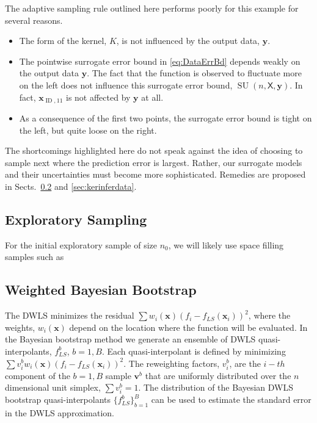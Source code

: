 \documentclass[11pt]{NSFamsart}
\DeclareMathOperator{\ID}{ID}
\DeclareMathOperator{\SURRERR}{SU}
\newcommand{\mX}{\mathsf{X}}
\newcommand{\bx}{{\boldsymbol{x}}}
\newcommand{\bv}{{\boldsymbol{v}}}
\newcommand{\by}{{\boldsymbol{y}}}
\begin{document}
The adaptive sampling rule outlined here performs poorly for this example for several reasons.
\begin{itemize}
    \item The form of the kernel, $K$, is not influenced by the output data, $\by$.
    
    \item The pointwise surrogate error bound in \eqref{eq:DataErrBd} depends weakly on the output data $\by$.  The fact that the function is observed to fluctuate more on the left does not influence this surrogate error bound, $\SURRERR(n,\mX,\by)$.  In fact, $\bx_{\ID,11}$ is not affected by $\by$ at all.
    
    \item As a consequence of the first two points, the surrogate error bound is tight on the left, but quite loose on the right. 
\end{itemize}
The shortcomings highlighted here do not speak against the idea of choosing to sample next where the prediction error is largest.  Rather, our surrogate models and their uncertainties must become more sophisticated.  Remedies are proposed in Sects.\ \ref{sec:Bootstrap} and \ref{sec:kerinferdata}.





\subsection{Exploratory Sampling} \label{sec:exploreSample}
For the initial exploratory sample of size $n_0$, we will likely use space filling samples such as 

\subsection{Weighted Bayesian Bootstrap} \label{sec:Bootstrap}
The DWLS minimizes the residual $\sum w_i(\bx)(f_i - f_{LS}(\bx_i))^2$, where the weights, $w_i(\bx)$ depend on the location where the function will be evaluated. In the Bayesian bootstrap method \cite{rubin1981bayesian, efron1986bootstrap, efron2016computer} we generate an ensemble of DWLS quasi-interpolants, $f_{LS}^b$, $b=1,B$. Each quasi-interpolant is defined by minimizing $\sum v_i^b w_i(\bx)(f_i - f_{LS}(\bx_i))^2$.   The reweighting factors, $v_i^b$, are the $i-th$ component of the $b=1,B$ sample $\bv^b$ that are uniformly distributed over the $n$ dimensional unit simplex, $\sum v_i^b = 1 $.  The distribution of the Bayesian DWLS bootstrap quasi-interpolants $\{f_{LS}^b \}_{b=1}^B$ can  be used to estimate the standard error in the DWLS approximation. 
\end{document}
